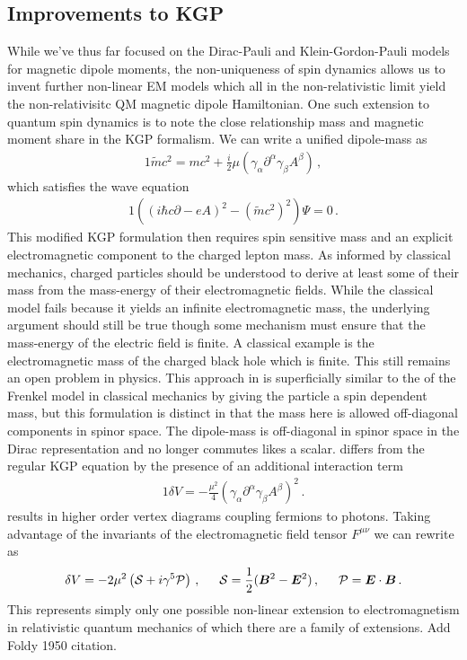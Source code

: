 \subsection{Improvements to KGP}\label{ajsss:ext}
While we've thus far focused on the Dirac-Pauli and Klein-Gordon-Pauli models for magnetic dipole moments, the non-uniqueness of spin dynamics allows us to invent further non-linear EM models which all in the non-relativistic limit yield the non-relativisitc QM magnetic dipole Hamiltonian. One such extension to quantum spin dynamics is to note the close relationship mass and magnetic moment share in the KGP formalism. We can write a unified dipole-mass as
\begin{alignat}{1}
    \label{eq:ext:01} \widetilde{m}c^{2}=mc^{2}+\frac{i}{2}\mu\left(\gamma_{\alpha}\partial^{\alpha}\gamma_{\beta}A^{\beta}\right)\,,
\end{alignat}
which satisfies the wave equation
\begin{alignat}{1}
    \label{eq:ext:02} \left((i\hbar c\partial-eA)^{2}-(\widetilde{m}c^{2})^{2}\right)\Psi=0\,.
\end{alignat}
This modified KGP formulation then requires spin sensitive mass and an explicit electromagnetic component to the charged lepton mass. As informed by classical mechanics, charged particles should be understood to derive at least some of their mass from the mass-energy of their electromagnetic fields. While the classical model fails because it yields an infinite electromagnetic mass, the underlying argument should still be true though some mechanism must ensure that the mass-energy of the electric field is finite. A classical example is the electromagnetic mass of the charged black hole which is finite. This still remains an open problem in physics. This approach in  is superficially similar to the of the Frenkel model in classical mechanics by giving the particle a spin dependent mass, but this formulation is distinct in that the mass here is allowed off-diagonal components in spinor space. The dipole-mass is off-diagonal in spinor space in the Dirac representation and no longer commutes likes a scalar.  differs from the regular KGP equation by the presence of an additional interaction term
\begin{alignat}{1}
    \label{eq:ext:03} \delta V=-\frac{\mu^{2}}{4}\left(\gamma_{\alpha}\partial^{\alpha}\gamma_{\beta}A^{\beta}\right)^{2}\,.
\end{alignat}
 results in higher order vertex diagrams coupling fermions to photons. Taking advantage of the invariants of the electromagnetic field tensor $F^{\mu\nu}$ we can rewrite  as
\begin{alignat}{1}
    \label{eq:ext:04a} \delta V=-2\mu^{2}\left(\mathcal{S}+i\gamma^{5}\mathcal{P}\right)\,,\indent\mathcal{S}=\frac{1}{2}(\bb{B}^{2}-\bb{E}^{2})\,,\indent \mathcal{P}=\bb{E}\cdot\bb{B}\,.
\end{alignat}
This represents simply only one possible non-linear extension to electromagnetism in relativistic quantum mechanics of which there are a family of extensions. {\color{red}Add Foldy 1950 citation.}

